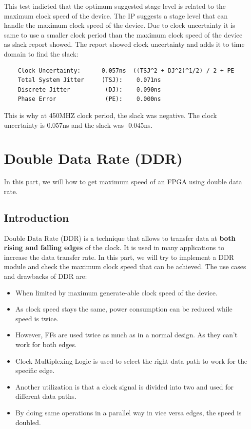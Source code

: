 \documentclass{report}
\begin{document}
This test indicted that the optimum suggested stage level is related to the maximum clock speed of the device. The IP suggests a stage level that can handle the maximum clock speed of the device. Due to clock uncertainty it is same to use a smaller clock period than the maximum clock speed of the device as slack report showed. The report showed clock uncertainty and adds it to time domain to find the slack:
\begin{verbatim}
    Clock Uncertainty:      0.057ns  ((TSJ^2 + DJ^2)^1/2) / 2 + PE
    Total System Jitter     (TSJ):    0.071ns
    Discrete Jitter          (DJ):    0.090ns
    Phase Error              (PE):    0.000ns
\end{verbatim}
This is why at 450MHZ clock period, the slack was negative. The clock uncertainty is 0.057ns and the slack was -0.045ns.

\section{Double Data Rate (DDR)}
In this part, we will how to get maximum speed of an FPGA using double data rate.
\subsection{Introduction}
Double Data Rate (DDR) is a technique that allows to transfer data at \textbf{both rising and falling edges} of the clock. It is used in many applications to increase the data transfer rate. In this part, we will try to implement a DDR module and check the maximum clock speed that can be achieved. The use cases and drawbacks of DDR are:
\begin{itemize}
    \item When limited by maximum generate-able clock speed of the device.
    \item As clock speed stays the same, power consumption can be reduced while speed is twice.
    \item However, FFs are used twice as much as in a normal design. As they can't work for both edges.
    \item Clock Multiplexing Logic is used to select the right data path to work for the specific edge.
    \item Another utilization is that a clock signal is divided into two and used for different data paths.
    \item By doing same operations in a parallel way in vice versa edges, the speed is doubled.
\end{itemize}
\end{document}
